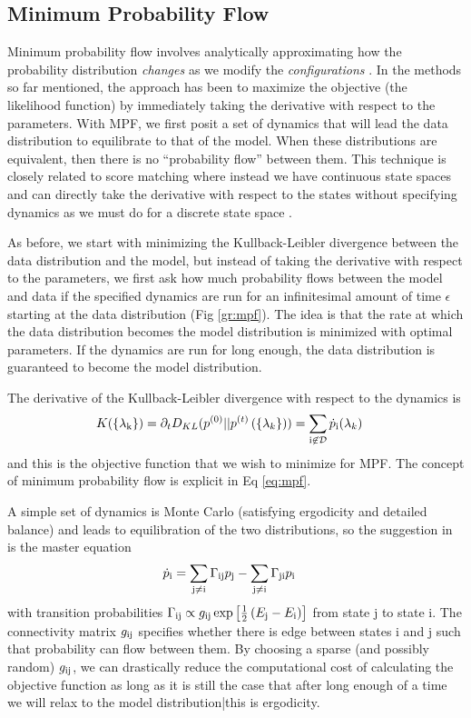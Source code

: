 \documentclass[aps,prl,twocolumn]{revtex4-1}
\begin{document}
\subsection{Minimum Probability Flow}
Minimum probability flow involves analytically approximating how the probability distribution \textit{changes} as we modify the \textit{configurations} \cite{SohlDickstein:2011im}. In the methods so far mentioned, the approach has been to maximize the objective (the likelihood function) by immediately taking the derivative with respect to the parameters. With MPF, we first posit a set of dynamics that will lead the data distribution to equilibrate to that of the model. When these distributions are equivalent, then there is no ``probability flow'' between them. This technique is closely related to score matching where instead we have continuous state spaces and can directly take the derivative with respect to the states without specifying dynamics as we must do for a discrete state space \cite{Hyvarinen:2007ed}.

As before, we start with minimizing the Kullback-Leibler divergence between the data distribution and the model, but instead of taking the derivative with respect to the parameters, we first ask how much probability flows between the model and data if the specified dynamics are run for an infinitesimal amount of time $\epsilon$ starting at the data distribution (Fig \ref{gr:mpf}).
The idea is that the rate at which the data distribution becomes the model distribution is minimized with optimal parameters. If the dynamics are run for long enough, the data distribution is guaranteed to become the model distribution.

The derivative of the Kullback-Leibler divergence with respect to the dynamics is
\begin{align}
	K(\{\lambda_{\rm k}\}) = \partial_t D_{KL}(p^{(0)}||p^{(t)}\left(\{\lambda_k\}\right)) &= \sum_{\rm i \not\in \mathcal{D}} \dot{p}_{\rm i}(\lambda_k) \label{eq:mpf}
\end{align}
and this is the objective function that we wish to minimize for MPF. The concept of minimum probability flow is explicit in Eq \ref{eq:mpf}.

A simple set of dynamics is Monte Carlo (satisfying ergodicity and detailed balance) and leads to equilibration of the two distributions, so the suggestion in \cite{SohlDickstein:2011im} is the master equation
\begin{align}
	\dot{p}_{\rm i} &= \sum_{\rm j\neq i} \Gamma_{\rm ij} p_{\rm j} -\sum_{\rm j\neq i} \Gamma_{\rm ji} p_{\rm i}
\end{align}
with transition probabilities $\Gamma_{\rm ij} \propto g_{\rm ij}\exp\left[ \frac{1}{2}\left( E_{\rm j}-E_{\rm i} \right) \right]$ from state j to state i. The connectivity matrix $g_{\rm ij}$ specifies whether there is edge between states i and j such that probability can flow between them.
By choosing a sparse (and possibly random) $g_{\rm ij}$, we can drastically reduce the computational cost of calculating the objective function as long as it is still the case that after long enough of a time we will relax to the model distribution|this is ergodicity.
\end{document}
